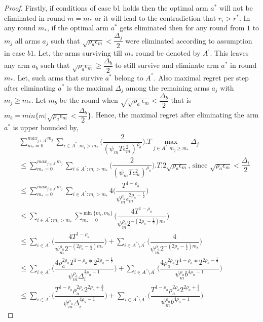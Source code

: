 \begin{proof}
	Firstly, if conditions of case b1 holds then the optimal arm $a^{*}$ will not be eliminated in round $m=m_{*}$ or it will lead to the contradiction that $r_{i}>r^{*}$. In any round $m_{*}$, if the optimal arm $a^{*}$ gets eliminated then for any round from $1$ to $m_{j}$ all arms $a_{j}$ such that $\sqrt{\rho_{a}\epsilon_{m}}<\dfrac{\Delta_{j}}{2}$ were eliminated according to assumption in case $b1$. Let, the arms surviving till $m_{*}$ round be denoted by $A^{'}$. This leaves any arm $a_{b}$ such that $\sqrt{\rho_{a}\epsilon_{m}}\geq\dfrac{\Delta_{b}}{2}$ to still survive and eliminate arm $a^{*}$ in round $m_{*}$. Let, such arms that survive $a^{*}$ belong to $A^{''}$. Also maximal regret per step after eliminating $a^{*}$ is the maximal $\Delta_{j}$ among the remaining arms $a_{j}$ with $m_{j}\geq m_{*}$.  Let $m_{b}$ be the round when $\sqrt{\sqrt{\rho_{a}}\epsilon_{m}}<\dfrac{\Delta_{b}}{2}$ that is $m_{b}=min\lbrace m|\sqrt{\rho_{a}\epsilon_{m}}<\dfrac{\Delta_{b}}{2}\rbrace$. Hence, the 
maximal regret after eliminating the arm $a^{*}$ is upper bounded by, 
\begin{align*}
&\sum_{m_{*}=0}^{max_{j\in A^{'}}m_{j}}\sum_{i\in A^{''}:m_{i}>m_{*}}\bigg(\dfrac{2}{(\psi_{m}T\epsilon_{m}^{2})^{\rho_{a}}} \bigg).T\max_{j\in A^{''}:m_{j}\geq m_{*}}{\Delta}_{j}\\
&\leq\sum_{m_{*}=0}^{max_{j\in A^{'}}m_{j}}\sum_{i\in A^{''}:m_{i}>m_{*}}\bigg(\dfrac{2}{(\psi_{m}T\epsilon_{m}^{2})^{\rho_{a}}} \bigg).T.2\sqrt{\rho_{a}\epsilon_{m}}\text{, since } \sqrt{\rho_{a}\epsilon_{m}}<\dfrac{\Delta_{i}}{2}\\
&\leq\sum_{m_{*}=0}^{max_{j\in A^{'}}m_{j}}\sum_{i\in A^{''}:m_{i}>m_{*}}4\bigg(\dfrac{T^{1-\rho_{a}}}{\psi_{m}^{\rho_{a}}\epsilon_{m}^{2\rho_{a}-\frac{1}{2}}} \bigg)\\
&\leq\sum_{i\in A^{''}:m_{i}>m_{*}}\sum_{m_{*}=0}^{\min{\lbrace m_{i},m_{b}\rbrace}}\bigg(\dfrac{4T^{1-\rho_{a}}}{\psi_{m}^{\rho_{a}}2^{-(2\rho_{a}-\frac{1}{2})m_{*}}} \bigg)\\
&\leq\sum_{i\in A^{'}}\bigg(\dfrac{4T^{1-\rho_{a}}}{\psi_{m}^{\rho_{a}}2^{-(2\rho_{a}-\frac{1}{2})m_{*}}} \bigg)+\sum_{i\in A^{''}\setminus A^{'}}\bigg(\dfrac{4}{\psi_{m}^{\rho_{a}}2^{-(2\rho_{a}-\frac{1}{2})m_{b}}} \bigg)\\
&\leq\sum_{i\in A^{'}}\bigg(\dfrac{4\rho_{a}^{2\rho_{a}}T^{1-\rho_{a}}*2^{2\rho_{a}-\frac{1}{2}}}{\psi_{m}^{\rho_{a}}\Delta_{i}^{4\rho_{a}-1}} \bigg)+\sum_{i\in A^{''}\setminus A^{'}}\bigg(\dfrac{4\rho_{a}^{2\rho_{a}}T^{1-\rho_{a}}*2^{2\rho_{a}-\frac{1}{2}}}{\psi_{m}^{\rho_{a}}b^{4\rho_{a}-1}} \bigg)\\
&\leq\sum_{i\in A^{'}}\bigg(\dfrac{T^{1-\rho_{a}}\rho_{a}^{2\rho_{a}}2^{2\rho_{a}+\frac{3}{2}}}{\psi_{m}^{\rho_{a}}\Delta_{i}^{4\rho_{a}-1}} \bigg)+\sum_{i\in A^{''}\setminus A^{'}}\bigg(\dfrac{T^{1-\rho_{a}}\rho_{a}^{2\rho_{a}}2^{2\rho_{a}+\frac{3}{2}}}{\psi_{m}^{\rho_{a}}b^{4\rho_{a}-1}} \bigg)
\end{align*}


\end{proof}

